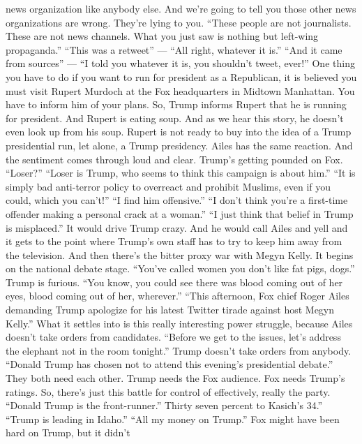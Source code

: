 \begin{itemize}
  news organization like anybody else. And we're going to tell you those
  other news organizations are wrong. They're lying to you. ``These
  people are not journalists. These are not news channels. What you just
  saw is nothing but left-wing propaganda.'' ``This was a retweet'' ---
  ``All right, whatever it is.'' ``And it came from sources'' --- ``I
  told you whatever it is, you shouldn't tweet, ever!'' One thing you
  have to do if you want to run for president as a Republican, it is
  believed you must visit Rupert Murdoch at the Fox headquarters in
  Midtown Manhattan. You have to inform him of your plans. So, Trump
  informs Rupert that he is running for president. And Rupert is eating
  soup. And as we hear this story, he doesn't even look up from his
  soup. Rupert is not ready to buy into the idea of a Trump presidential
  run, let alone, a Trump presidency. Ailes has the same reaction. And
  the sentiment comes through loud and clear. Trump's getting pounded on
  Fox. ``Loser?'' ``Loser is Trump, who seems to think this campaign is
  about him.'' ``It is simply bad anti-terror policy to overreact and
  prohibit Muslims, even if you could, which you can't!'' ``I find him
  offensive.'' ``I don't think you're a first-time offender making a
  personal crack at a woman.'' ``I just think that belief in Trump is
  misplaced.'' It would drive Trump crazy. And he would call Ailes and
  yell and it gets to the point where Trump's own staff has to try to
  keep him away from the television. And then there's the bitter proxy
  war with Megyn Kelly. It begins on the national debate stage. ``You've
  called women you don't like fat pigs, dogs.'' Trump is furious. ``You
  know, you could see there was blood coming out of her eyes, blood
  coming out of her, wherever.'' ``This afternoon, Fox chief Roger Ailes
  demanding Trump apologize for his latest Twitter tirade against host
  Megyn Kelly.'' What it settles into is this really interesting power
  struggle, because Ailes doesn't take orders from candidates. ``Before
  we get to the issues, let's address the elephant not in the room
  tonight.'' Trump doesn't take orders from anybody. ``Donald Trump has
  chosen not to attend this evening's presidential debate.'' They both
  need each other. Trump needs the Fox audience. Fox needs Trump's
  ratings. So, there's just this battle for control of effectively,
  really the party. ``Donald Trump is the front-runner.'' Thirty seven
  percent to Kasich's 34.'' ``Trump is leading in Idaho.'' ``All my
  money on Trump.'' Fox might have been hard on Trump, but it didn't

\end{itemize}

